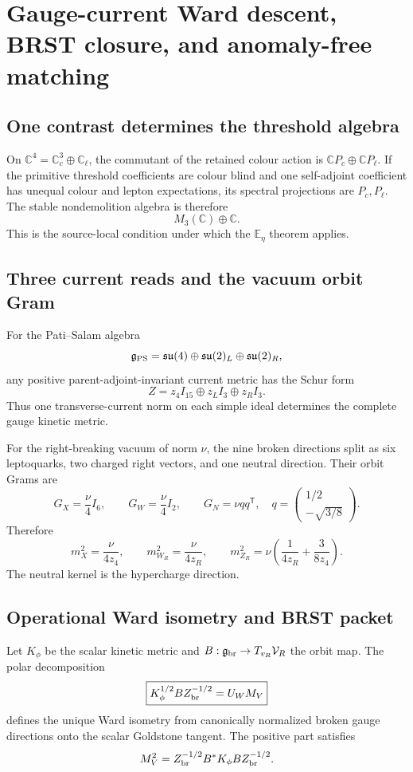 \documentclass[11pt,oneside,openany]{book}
\numberwithin{equation}{chapter}
\theoremstyle{definition}
\theoremstyle{remark}
\newcommand{\C}{\mathbb C}
\begin{document}
\chapter{Gauge-current Ward descent, BRST closure, and anomaly-free matching}
\label{ch:v5-gauge-ward}

\section{One contrast determines the threshold algebra}
On \(\C^4=\C_c^3\oplus\C_\ell\), the commutant of the retained colour action
is \(\C P_c\oplus\C P_\ell\).  If the primitive threshold coefficients are
colour blind and one self-adjoint coefficient has unequal colour and lepton
expectations, its spectral projections are \(P_c,P_\ell\).  The stable
nondemolition algebra is therefore
\[
 \boxed{M_3(\C)\oplus\C.}
\]
This is the source-local condition under which the \(\mathbb E_\eta\) theorem
applies.

\section{Three current reads and the vacuum orbit Gram}
For the Pati--Salam algebra
\[
 \mathfrak g_{\rm PS}
 =\mathfrak{su}(4)\oplus\mathfrak{su}(2)_L\oplus\mathfrak{su}(2)_R,
\]
any positive parent-adjoint-invariant current metric has the Schur form
\[
 \boxed{Z=z_4I_{15}\oplus z_LI_3\oplus z_RI_3.}
\]
Thus one transverse-current norm on each simple ideal determines the complete
gauge kinetic metric.

For the right-breaking vacuum of norm \(\nu\), the nine broken directions
split as six leptoquarks, two charged right vectors, and one neutral direction.
Their orbit Grams are
\[
 G_X=\frac\nu4I_6,
 \qquad
 G_W=\frac\nu4I_2,
 \qquad
 G_N=\nu qq^{\mathsf T},
 \quad
 q=\begin{pmatrix}1/2\\-\sqrt{3/8}\end{pmatrix}.
\]
Therefore
\[
 \boxed{
 m_X^2=\frac\nu{4z_4},
 \qquad
 m_{W_R}^2=\frac\nu{4z_R},
 \qquad
 m_{Z_R}^2=\nu\left(\frac1{4z_R}+\frac3{8z_4}\right).}
\]
The neutral kernel is the hypercharge direction.

\section{Operational Ward isometry and BRST packet}
Let \(K_\phi\) be the scalar kinetic metric and
\(B:\mathfrak g_{\rm br}\to T_{v_R}\mathcal V_R\) the orbit map.  The polar
decomposition
\[
 \boxed{
 K_\phi^{1/2}BZ_{\rm br}^{-1/2}=U_WM_V}
\]
defines the unique Ward isometry from canonically normalized broken gauge
directions onto the scalar Goldstone tangent.  The positive part satisfies
\[
 M_V^2=Z_{\rm br}^{-1/2}B^*K_\phi BZ_{\rm br}^{-1/2}.
\]
\end{document}
